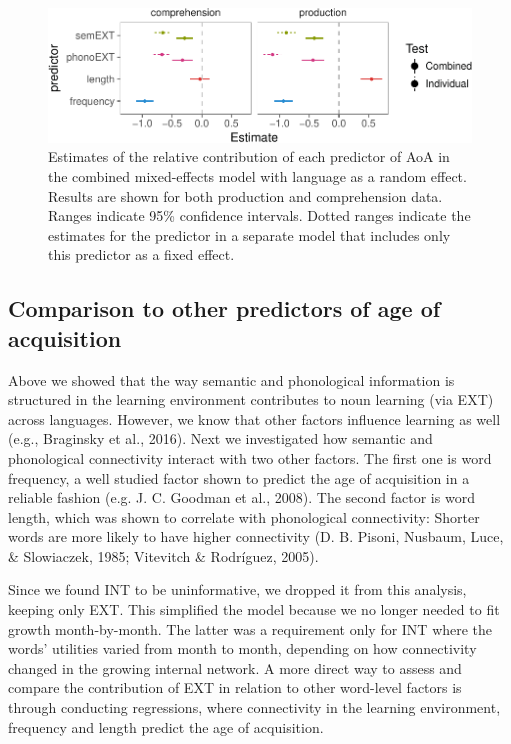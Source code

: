 \documentclass[english,floatsintext,man]{apa6}
\theoremstyle{definition}
\theoremstyle{definition}
\theoremstyle{definition}
\theoremstyle{remark}
\begin{document}
\begin{figure}[!h]
\includegraphics[width=\textwidth]{ms_files/figure-latex/staticAll-1} \caption{Estimates of the relative contribution of each predictor of AoA in the combined mixed-effects model with language as a random effect. Results are shown for both production and comprehension data. Ranges indicate 95\% confidence intervals. Dotted ranges indicate the estimates for the predictor in a separate model that includes only this predictor as a fixed effect.}\label{fig:staticAll}
\end{figure}

\subsection{Comparison to other predictors of age of
acquisition}\label{comparison-to-other-predictors-of-age-of-acquisition}

Above we showed that the way semantic and phonological information is
structured in the learning environment contributes to noun learning (via
EXT) across languages. However, we know that other factors influence
learning as well (e.g., Braginsky et al., 2016). Next we investigated
how semantic and phonological connectivity interact with two other
factors. The first one is word frequency, a well studied factor shown to
predict the age of acquisition in a reliable fashion (e.g. J. C. Goodman
et al., 2008). The second factor is word length, which was shown to
correlate with phonological connectivity: Shorter words are more likely
to have higher connectivity (D. B. Pisoni, Nusbaum, Luce, \& Slowiaczek,
1985; Vitevitch \& Rodríguez, 2005).

Since we found INT to be uninformative, we dropped it from this
analysis, keeping only EXT. This simplified the model because we no
longer needed to fit growth month-by-month. The latter was a requirement
only for INT where the words' utilities varied from month to month,
depending on how connectivity changed in the growing internal network. A
more direct way to assess and compare the contribution of EXT in
relation to other word-level factors is through conducting regressions,
where connectivity in the learning environment, frequency and length
predict the age of acquisition.
\end{document}
